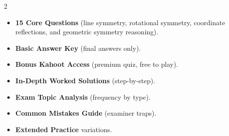 \documentclass[11pt,a4paper]{article}
\newcommand{\FullReleaseDate}{April 30, 2026}
\begin{document}
\vspace{8pt}

\begin{multicols}{2}
  \begin{tcolorbox}[card, title=\sffamily\bfseries\textcolor{white}{\faHandPointDown\ TODAY (Simplified Version)}, colbacktitle=mainblue, boxed title style={sharp corners, boxrule=0pt}]
    \begin{itemize}[leftmargin=1.2em, itemsep=2pt]
      \item \small \textbf{15 Core Questions} (line symmetry, rotational symmetry, coordinate reflections, and geometric symmetry reasoning).
      \item \small \textbf{Basic Answer Key} (final answers only).
      \item \small \textbf{Bonus Kahoot Access} (premium quiz, free to play).
    \end{itemize}
  \end{tcolorbox}

  \columnbreak

  \begin{tcolorbox}[card, title=\sffamily\bfseries\textcolor{white}{\faRocket\ ON \FullReleaseDate\ (Full Upgrade)}, colbacktitle=mainblue, boxed title style={sharp corners, boxrule=0pt}]
    \begin{itemize}[leftmargin=1.2em, itemsep=2pt]
      \item \small \textbf{In-Depth Worked Solutions} (step-by-step).
      \item \small \textbf{Exam Topic Analysis} (frequency by type).
      \item \small \textbf{Common Mistakes Guide} (examiner traps).
      \item \small \textbf{Extended Practice} variations.
    \end{itemize}
  \end{tcolorbox}
\end{multicols}
\end{document}
